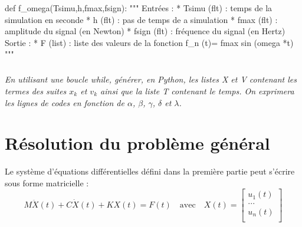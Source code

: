 \documentclass[10pt]{article}
\newif\ifprof
\begin{document}
\begin{py}
\begin{python}
def f_omega(Tsimu,h,fmax,fsign):
   """
   Entrées :
       * Tsimu (flt) : temps de la simulation en seconde
       * h (flt) : pas de temps de a simulation
       * fmax (flt) : amplitude du signal (en Newton)
       * fsign (flt) : fréquence du signal (en Hertz)
   Sortie : 
       * F (list) : liste des valeurs de la fonction 
          f_n (t)= fmax sin (omega *t)
   """
\end{python}
\end{py}

\ifprof
\begin{corrige}
\begin{py}
\begin{python}
def f_omega(Tsimu,h,fmax,fsign):
   """
   Entrées :
       * Tsimu (flt) : temps de la simulation en seconde
       * h (flt) : pas de temps de a simulation
       * fmax (flt) : amplitude du signal (en Newton)
       * fsign (flt) : fréquence du signal (en Hertz)
   Sortie : 
       * F (list) : liste des valeurs de la fonction 
          f_n (t)= fmax sin (omega *t)
   """
    omega  = 2*math.pi*fsign
    t=0 
    F = []
    while t<Tsimu :
        F.append(fmax*math.sin(omega*t))
        t=t+h
    return F
    
\end{python}
\end{py}

\end{corrige}
\else
\fi


\subparagraph{}
\textit{En utilisant une boucle \textsf{while}, générer, en Python, les listes \textsf{X} et \textsf{V} contenant les termes des suites $x_k$ et $v_k$ ainsi que la liste \textsf{T} contenant le temps. On exprimera les lignes de codes en fonction de $\alpha$, $\beta$, $\gamma$, $\delta$ et $\lambda$.}
\ifprof
\begin{corrige}
\begin{python}
t = 0
T,X,V = [t],[0],[0]
F = f_omega(Tsimu,h,fmax,fsign)
i=0
while t<Tsimu:
    t = t+h
    T.append(t)
    X.append(alpha*V[i]+beta*X[i])
    V.append(gamma*F[i]+delta*X[i]+lambd*V[i])    
    i=i+1

\end{python}
\end{corrige}
\else
\fi


\section{Résolution du problème général}
Le système d'équations différentielles défini dans la première partie peut s'écrire sous forme matricielle :
$$
M \ddot{X}(t) +C \dot{X}(t) +K {X}(t) = F(t) \quad \text{avec} \quad 
X(t)=\left[
\begin{array}{c} 
u_1(t) \\ 
... \\ 
u_n(t) \\
\end{array}\right]
$$
\end{document}
